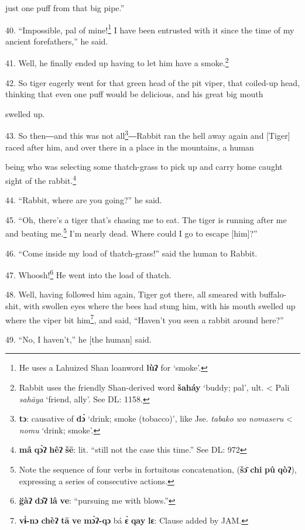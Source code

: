 just one puff from that big pipe.''

40. ``Impossible, pal of mine!\footnote{He uses a Lahuized Shan loanword \textbf{lùʔ} for `smoke'.} I have been entrusted with it since the time
of my ancient forefathers,'' he said.

41. Well, he finally ended up having to let him have a smoke.\footnote{Rabbit uses the friendly Shan-derived word \textbf{šaháy} `buddy; pal', ult. < Pali \textit{sahāya }`friend, ally'. See DL: 1158.}

42. So tiger eagerly went for that green head of the pit viper, that coiled-up
head, thinking that even one puff would be delicious, and his great big mouth


swelled up.

43. So then―and this was not all\footnote{\textbf{tɔ}: causative of \textbf{dɔ̀} `drink; smoke (tobacco)', like Jse. \textit{tabako wo nomaseru }< \textit{nomu} `drink; smoke'.}―Rabbit ran the hell away again and [Tiger]
raced after him, and over there in a place in the mountains, a human

being who was selecting some thatch-grass to pick up and carry home caught sight
of the rabbit.\footnote{\textbf{mâ} \textbf{qɔ̀ʔ} \textbf{hêʔ} \textbf{šē}: lit. ``still not the case this time.'' See DL: 972}

44. ``Rabbit, where are you going?'' he said.

45. ``Oh, there's a tiger that's chasing me to eat. The tiger is running after
me and beating me.\footnote{Note the sequence of four verbs in fortuitous concatenation, (\textbf{šɔ̄} \textbf{chi} \textbf{pû} \textbf{qòʔ}), expressing a series of consecutive actions.} I'm nearly dead. Where could I go to escape [him]?''

46. ``Come inside my load of thatch-grass!'' said the human to Rabbit.

47. Whoosh!\footnote{\textbf{g̈àʔ} \textbf{dɔ̂ʔ} \textbf{lâ} \textbf{ve}: ``pursuing me with blows.''} He went into the load of thatch.

48. Well, having followed him again, Tiger got there, all smeared with buffalo-shit,
with swollen eyes where the bees had stung him, with his mouth swelled up where
the viper bit him\footnote{\textbf{vɨ̀-nɔ} \textbf{chèʔ} \textbf{tā} \textbf{ve} \textbf{mɔ̀ʔ-qɔ} bá \textbf{ɛ̀} \textbf{qay} \textbf{lɛ}: Clause added by JAM.}, and said, ``Haven't you seen a rabbit around here?''

49. ``No, I haven't,'' he [the human] said.

